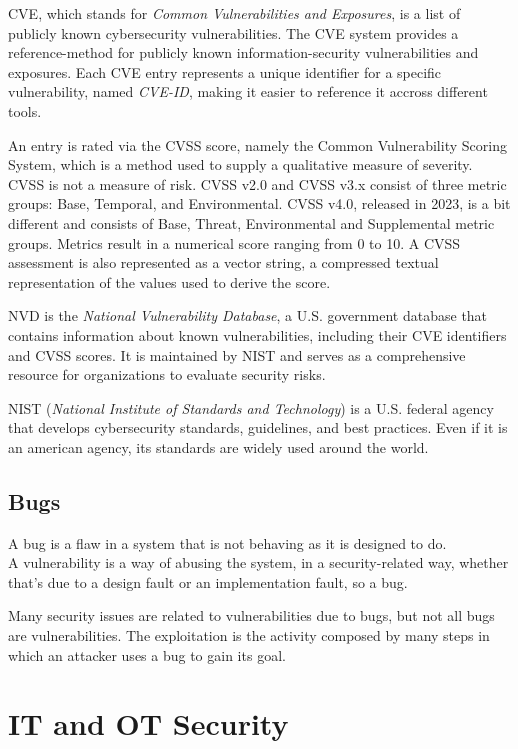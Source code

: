 CVE, which stands for \textit{Common Vulnerabilities and Exposures}, is a list of publicly known cybersecurity vulnerabilities. The CVE system provides a reference-method for publicly known information-security vulnerabilities and exposures. Each CVE entry represents a unique identifier for a specific vulnerability, named \textit{CVE-ID}, making it easier to reference it accross different tools. 

An entry is rated via the CVSS score, namely the Common Vulnerability Scoring System, which is a method used to supply a qualitative measure of severity. CVSS is not a measure of risk. CVSS v2.0 and CVSS v3.x consist of three metric groups: Base, Temporal, and Environmental. CVSS v4.0, released in 2023, is a bit different and consists of Base, Threat, Environmental and Supplemental metric groups. Metrics result in a numerical score ranging from 0 to 10. A CVSS assessment is also represented as a vector string, a compressed textual representation of the values used to derive the score.~\cite{cvss-metrics}


NVD is the \textit{National Vulnerability Database}, a U.S. government database that contains information about known vulnerabilities, including their CVE identifiers and CVSS scores. It is maintained by NIST and serves as a comprehensive resource for organizations to evaluate security risks.

NIST (\textit{National Institute of Standards and Technology}) is a U.S. federal agency that develops cybersecurity standards, guidelines, and best practices. Even if it is an american agency, its standards are widely used around the world.

\subsection{Bugs}

A bug is a flaw in a system that is not behaving as it is designed to do.\\
A vulnerability is a way of abusing the system, in a security-related way, whether that's due to a design fault or an implementation fault, so a bug.

Many security issues are related to vulnerabilities due to bugs, but not all bugs are vulnerabilities. The exploitation is the activity composed by many steps in which an attacker uses a bug to gain its goal.

\section{IT and OT Security}
 
